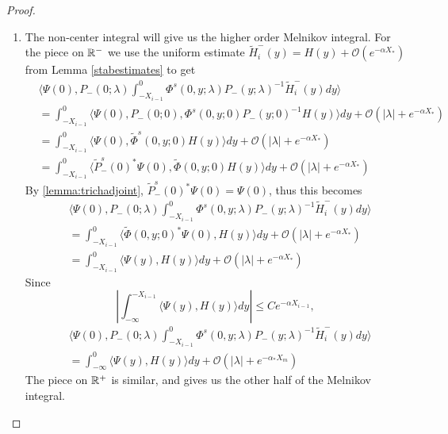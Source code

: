 \documentclass[thesis.tex]{subfiles}
\begin{document}
\begin{lemma}
\begin{proof}
\begin{enumerate}
\item The non-center integral will give us the higher order Melnikov integral. For the piece on $\mathbb{R}^-$ we use the uniform estimate $\tilde{H}_i^-(y) = H(y) + \mathcal{O}(e^{-\alpha X_*})$ from Lemma \ref{stabestimates} to get
\begin{align*}
&\langle \Psi(0), P_-(0; \lambda) \int_{-X_{i-1}}^0 \Phi^s(0, y; \lambda) P_-(y; \lambda)^{-1} \tilde{H}_i^-(y) dy \rangle \\
&= \int_{-X_{i-1}}^0 \langle \Psi(0), P_-(0; 0), \Phi^s(0, y; 0) P_-(y; 0)^{-1} H(y) \rangle dy + \mathcal{O}(|\lambda| + {e^{-\alpha X_*}}) \\
&= \int_{-X_{i-1}}^0 \langle \Psi(0), \tilde{\Phi}^s(0, y; 0) H(y) \rangle dy + \mathcal{O}(|\lambda| + {e^{-\alpha X_*}}) \\
&= \int_{-X_{i-1}}^0 \langle \tilde{P}_-^s(0)^*\Psi(0), \tilde{\Phi}(0, y; 0) H(y) \rangle dy + \mathcal{O}(|\lambda| + {e^{-\alpha X_*}})
\end{align*}
By \ref{lemma:trichadjoint}, $\tilde{P}_-^s(0)^*\Psi(0) = \Psi(0)$, thus this becomes
\begin{align*}
&\langle \Psi(0), P_-(0; \lambda) \int_{-X_{i-1}}^0 \Phi^s(0, y; \lambda) P_-(y; \lambda)^{-1} \tilde{H}_i^-(y) dy \rangle \\
&= \int_{-X_{i-1}}^0 \langle \tilde{\Phi}(0, y; 0) ^* \Psi(0), H(y) \rangle dy + \mathcal{O}(|\lambda| + {e^{-\alpha X_*}}) \\
&= \int_{-X_{i-1}}^0 \langle \Psi(y), H(y) \rangle dy + \mathcal{O}(|\lambda| + {e^{-\alpha X_*}})
\end{align*}
Since 
\[
\left| \int_{-\infty}^{-X_{i-1}} \langle \Psi(y), H(y) \rangle dy \right| \leq C e^{-\alpha X_{i-1}},
\]
\begin{align*}
&\langle \Psi(0), P_-(0; \lambda) \int_{-X_{i-1}}^0 \Phi^s(0, y; \lambda) P_-(y; \lambda)^{-1} \tilde{H}_i^-(y) dy \rangle \\
&= \int_{-\infty}^0 \langle \Psi(y), H(y) \rangle dy + \mathcal{O}(|\lambda| + {e^{-\alpha_* X_m}})
\end{align*}
The piece on $\mathbb{R}^+$ is similar, and gives us the other half of the Melnikov integral.


\end{enumerate}
\end{proof}
\end{lemma}
\end{document}
